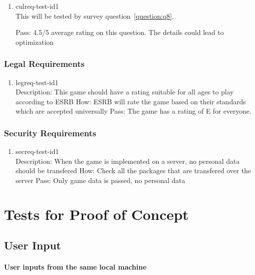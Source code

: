 \documentclass[12pt, titlepage]{article}
\begin{document}
\begin{enumerate}

\item{culreq-test-id1\\}
This will be tested by survey question~\ref{question:q8}.

Pass: 4.5/5 average rating on this question. The details could lead to optimization
\end{enumerate}

\subsubsection{Legal Requirements}

\begin{enumerate}

\item{legreq-test-id1\\}
Description: This game should have a rating suitable for all ages to play
according to ESRB How: ESRB will rate the game based on their standards which
are accepted universally Pass: The game has a rating of E for everyone.
\end{enumerate}

\subsubsection{Security Requirements}

\begin{enumerate}

\item{secreq-test-id1\\}
Description: When the game is implemented on a server, no personal data should
be transfered How: Check all the packages that are transfered over the server
Pass: Only game data is passed, no personal data
\end{enumerate}

\section{Tests for Proof of Concept} \label{POC}

\subsection{User Input}
		
\paragraph{User inputs from the same local machine}
\end{document}
